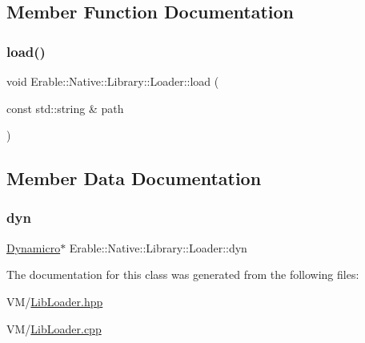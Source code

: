 \subsection{Member Function Documentation}
\mbox{\label{class_erable_1_1_native_1_1_library_1_1_loader_a6a8afe74acc286b176b007861c17c686}} 
\subsubsection{\texorpdfstring{load()}{load()}}
{\footnotesize\ttfamily void Erable\+::\+Native\+::\+Library\+::\+Loader\+::load (\begin{DoxyParamCaption}\item[{const std\+::string \&}]{path }\end{DoxyParamCaption})}



\subsection{Member Data Documentation}
\mbox{\label{class_erable_1_1_native_1_1_library_1_1_loader_a98c28fbf70740dcc09d18752117aac68}} 
\subsubsection{\texorpdfstring{dyn}{dyn}}
{\footnotesize\ttfamily \mbox{\hyperlink{class_dynamicro}{Dynamicro}}$\ast$ Erable\+::\+Native\+::\+Library\+::\+Loader\+::dyn}



The documentation for this class was generated from the following files\+:\begin{DoxyCompactItemize}
\item 
V\+M/\mbox{\hyperlink{_lib_loader_8hpp}{Lib\+Loader.\+hpp}}\item 
V\+M/\mbox{\hyperlink{_lib_loader_8cpp}{Lib\+Loader.\+cpp}}\end{DoxyCompactItemize}
